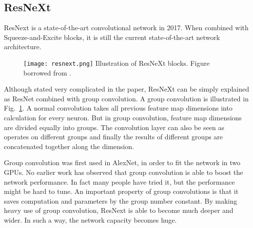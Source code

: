 \subsection{ResNeXt}

ResNext is a state-of-the-art convolutional network in 2017\cite{xie2017aggregated}. When combined with Squeeze-and-Excite blocks, it is still the current state-of-the-art network architecture.
\begin{figure}[!htp]
	\centering
	\texttt{[image: resnext.png]}
	{Illustration of ResNeXt blocks. Figure borrowed from \parencite{xie2017aggregated}.}
	\label{fig:resnext}
\end{figure}
Although stated very complicated in the paper, ResNeXt can be simply explained as ResNet combined with group convolution. A group convolution is illustrated in Fig.~\ref{fig:resnext}.  A normal convolution takes all previous feature map dimensions into calculation for every neuron. But in group convolution, feature map dimensions are divided equally into groups. The convolution layer can also be seen as operates on different groups and finally the results of different groups are concatenated together along the dimension.

Group convolution was first used in AlexNet, in order to fit the network in two GPUs. No earlier work has observed that group convolution is able to boost the network performance. In fact many people have tried it, but the performance might be hard to tune. An important property of group convolutions is that it saves computation and parameters by the group number constant. By making heavy use of group convolution, ResNext is able to become much deeper and wider. In such a way, the network capacity becomes huge.

